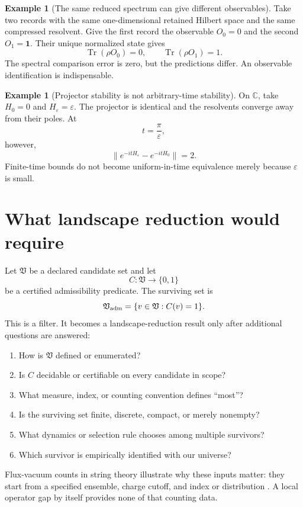 \documentclass[11pt]{article}
\theoremstyle{definition}
\newtheorem{example}[theorem]{Example}
\theoremstyle{remark}
\newcommand{\CC}{\mathbb C}
\newcommand{\1}{\mathbf 1}
\newcommand{\Tr}{\operatorname{Tr}}
\begin{document}
\begin{example}[The same reduced spectrum can give different observables]
\label{ex:observable}
Take two records with the same one-dimensional retained Hilbert space and
the same compressed resolvent.  Give the first record the observable
\(O_0=0\) and the second \(O_1=\1\).  Their unique normalized state gives
\[
 \Tr(\rho O_0)=0,
 \qquad
 \Tr(\rho O_1)=1.
\]
The spectral comparison error is zero, but the predictions differ.  An
observable identification is indispensable.
\end{example}

\begin{example}[Projector stability is not arbitrary-time stability]
\label{ex:time}
On \(\CC\), take \(H_0=0\) and \(H_\varepsilon=\varepsilon\).  The projector
is identical and the resolvents converge away from their poles.  At
\[
 t=\frac{\pi}{\varepsilon},
\]
however,
\[
 \|e^{-itH_\varepsilon}-e^{-itH_0}\|=2.
\]
Finite-time bounds do not become uniform-in-time equivalence merely because
\(\varepsilon\) is small.
\end{example}

\section{What landscape reduction would require}
\label{sec:landscape}

Let \(\mathfrak V\) be a declared candidate set and let
\[
 C:\mathfrak V\to\{0,1\}
\]
be a certified admissibility predicate.  The surviving set is
\[
 \mathfrak V_{\rm adm}
 =
 \{v\in\mathfrak V:C(v)=1\}.
\]
This is a filter.  It becomes a landscape-reduction result only after
additional questions are answered:
\begin{enumerate}[leftmargin=2em]
\item How is \(\mathfrak V\) defined or enumerated?
\item Is \(C\) decidable or certifiable on every candidate in scope?
\item What measure, index, or counting convention defines ``most''?
\item Is the surviving set finite, discrete, compact, or merely nonempty?
\item What dynamics or selection rule chooses among multiple survivors?
\item Which survivor is empirically identified with our universe?
\end{enumerate}

Flux-vacuum counts in string theory illustrate why these inputs matter:
they start from a specified ensemble, charge cutoff, and index or
distribution \cite{AshokDouglas2004,DouglasKachru2007}.  A local operator
gap by itself provides none of that counting data.
\end{document}

